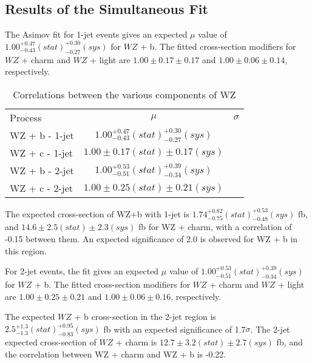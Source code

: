 \subsection{Results of the Simultaneous Fit}
\label{sec:resSum}

The Asimov fit for 1-jet events gives an expected $\mu$ value of $1.00^{+0.47}_{-0.43}(stat)^{+0.30}_{-0.27}(sys)$ for $WZ$ + b. The fitted cross-section modifiers for $WZ$ + charm and $WZ$ + light are $1.00 \pm 0.17 \pm 0.17$ and $1.00 \pm 0.06 \pm 0.14 $, respectively.

\hspace{-1in}\begin{table}[H]
\begin{adjustwidth}{-3em}{-3em}
\begin{center}
\begin{tabular}{l|cc}
\hline
Process & $\mu$ & $\sigma$ \\
WZ + b - 1-jet & $1.00^{+0.47}_{-0.43}(stat)^{+0.30}_{-0.27}(sys)$ & \\
WZ + c - 1-jet & $1.00 \pm 0.17(stat) \pm 0.17(sys)$ & \\
WZ + b - 2-jet & $1.00^{+0.53}_{-0.51}(stat)^{+0.39}_{-0.34}(sys)$ & \\
WZ + c - 2-jet & $1.00 \pm 0.25(stat) \pm 0.21(sys)$ & \\
\hline
\end{tabular}
\caption{Correlations between the various components of WZ}
\label{tab:WZ_res }
\end{center}
\end{adjustwidth}
\end{table}

The expected cross-section of WZ+b with 1-jet is $1.74^{+0.82}_{-0.75}(stat)^{+0.53}_{-0.48}(sys)$ fb, and $14.6 \pm 2.5 (stat) \pm 2.3 (sys)$ fb for WZ + charm, with a correlation of -0.15 between them. An expected significance of 2.0 is observed for WZ + b in this region. 

For 2-jet events, the fit gives an expected $\mu$ value of $1.00^{+0.53}_{-0.51}(stat)^{+0.39}_{-0.34}(sys)$ for $WZ$ + b. The fitted cross-section modifiers for $WZ$ + charm and $WZ$ + light are $1.00 \pm 0.25 \pm 0.21$ and $1.00 \pm 0.06 \pm 0.16 $, respectively.

The expected $WZ$ + b cross-section in the 2-jet region is $2.5^{+1.3}_{-1.3}(stat)^{+0.95}_{-0.83}(sys)$ fb with an expected significance of 1.7$\sigma$. The 2-jet expected cross-section of $WZ$ + charm is $12.7 \pm 3.2 (stat) \pm 2.7 (sys)$ fb, and the correlation between WZ + charm and WZ + b is -0.22. 

